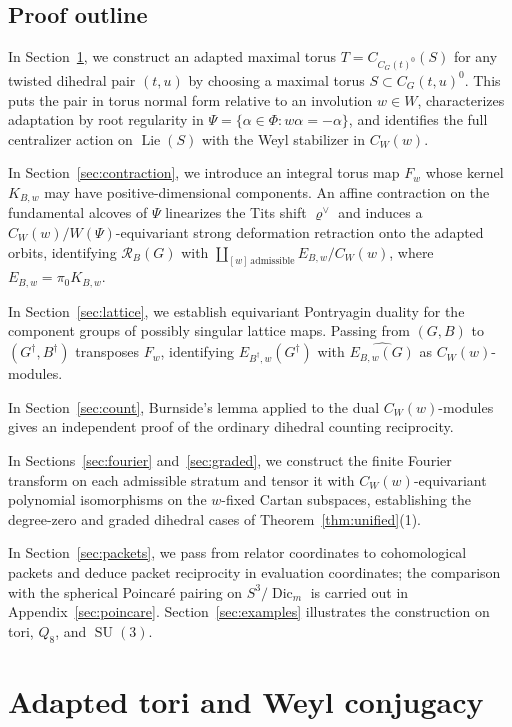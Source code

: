 \documentclass[11pt,a4paper,reqno]{amsart}
\theoremstyle{plain}
\theoremstyle{definition}
\theoremstyle{remark}
\numberwithin{equation}{section}
\DeclareMathOperator{\Lie}{Lie}
\newcommand{\SU}{\operatorname{SU}}
\newcommand{\cR}{\mathcal R}
\newcommand{\Dic}{\operatorname{Dic}}
\newcommand{\rh}{\varrho^\vee}
\begin{document}
\subsection{Proof outline}

In Section~\ref{sec:normal}, we construct an adapted maximal torus $T=C_{C_G(t)^0}(S)$ for any twisted dihedral pair $(t,u)$ by choosing a maximal torus $S\subset C_G(t,u)^0$. This puts the pair in torus normal form relative to an involution $w\in W$, characterizes adaptation by root regularity in $\Psi=\{\alpha\in\Phi:w\alpha=-\alpha\}$, and identifies the full centralizer action on $\Lie(S)$ with the Weyl stabilizer in $C_W(w)$.

In Section~\ref{sec:contraction}, we introduce an integral torus map $F_w$ whose kernel $K_{B,w}$ may have positive-dimensional components. An affine contraction on the fundamental alcoves of $\Psi$ linearizes the Tits shift $\rh$ and induces a $C_W(w)/W(\Psi)$-equivariant strong deformation retraction onto the adapted orbits, identifying $\cR_B(G)$ with $\coprod_{[w]\,\mathrm{admissible}} E_{B,w}/C_W(w)$, where $E_{B,w}=\pi_0 K_{B,w}$.

In Section~\ref{sec:lattice}, we establish equivariant Pontryagin duality for the component groups of possibly singular lattice maps. Passing from $(G,B)$ to $(G^\dagger,B^\dagger)$ transposes $F_w$, identifying $E_{B^\dagger,w}(G^\dagger)$ with $\widehat{E_{B,w}(G)}$ as $C_W(w)$-modules.

In Section~\ref{sec:count}, Burnside's lemma applied to the dual $C_W(w)$-modules gives an independent proof of the ordinary dihedral counting reciprocity.

In Sections~\ref{sec:fourier} and~\ref{sec:graded}, we construct the finite Fourier transform on each admissible stratum and tensor it with $C_W(w)$-equivariant polynomial isomorphisms on the $w$-fixed Cartan subspaces, establishing the degree-zero and graded dihedral cases of Theorem~\ref{thm:unified}\textup{(1)}.

In Section~\ref{sec:packets}, we pass from relator coordinates to cohomological packets and deduce packet reciprocity in evaluation coordinates; the comparison with the spherical Poincar\'e pairing on $S^3/\Dic_m$ is carried out in Appendix~\ref{sec:poincare}. Section~\ref{sec:examples} illustrates the construction on tori, $Q_8$, and $\SU(3)$.

\section{Adapted tori and Weyl conjugacy}\label{sec:normal}
\end{document}
